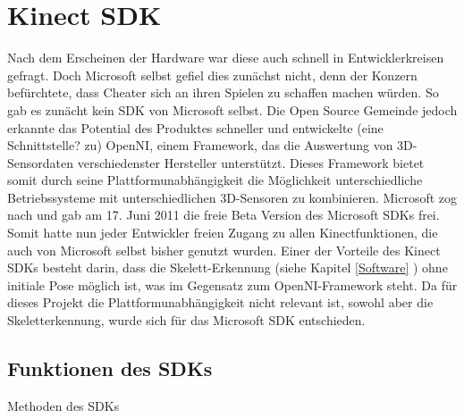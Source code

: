 \section{Kinect SDK}\label{SDK}
%
%
%
%
%
%
%

Nach dem Erscheinen der Hardware war diese auch schnell in Entwicklerkreisen gefragt. Doch Microsoft selbst gefiel dies zunächst nicht, denn der Konzern befürchtete, dass Cheater sich an ihren Spielen zu schaffen machen würden.
So gab es zunächt kein SDK von Microsoft selbst. Die Open Source Gemeinde jedoch erkannte das Potential des Produktes schneller und entwickelte (eine Schnittstelle? zu) OpenNI, einem Framework, das die Auswertung von 3D-Sensordaten verschiedenster Hersteller unterstützt. Dieses Framework bietet somit durch seine Plattformunabhängigkeit die Möglichkeit unterschiedliche Betriebssysteme mit unterschiedlichen 3D-Sensoren zu kombinieren.\cite{webb2012beginning}
Microsoft zog nach und gab am 17. Juni 2011 die freie Beta Version des Microsoft SDKs frei. Somit hatte nun jeder Entwickler freien Zugang zu allen Kinectfunktionen, die auch von Microsoft selbst bisher genutzt wurden. Einer der Vorteile des Kinect SDKs besteht darin, dass die Skelett-Erkennung (siehe Kapitel \ref{Software} ) ohne initiale Pose möglich ist, was im Gegensatz zum OpenNI-Framework steht. \cite{webb2012beginning} Da für dieses Projekt die Plattformunabhängigkeit nicht relevant ist, sowohl aber die Skeletterkennung, wurde sich für das Microsoft SDK entschieden.

\subsection{Funktionen des SDKs}
Methoden des SDKs




